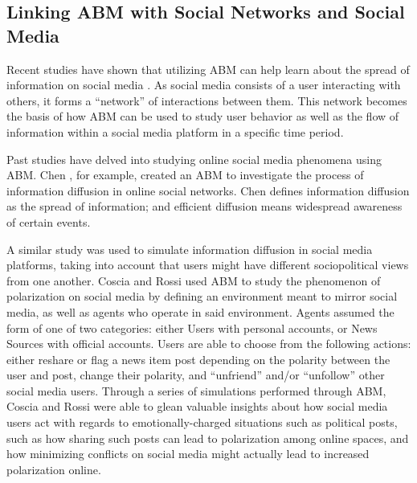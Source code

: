 \subsection{Linking ABM with Social Networks and Social Media}
Recent studies have shown that utilizing ABM can help learn about the spread of information on social media \cite{Fan-2018,Chen-2019,DiCarlo-2021,Coscia-2022}. As social media consists of a user interacting with others, it forms a “network” of interactions between them. This network becomes the basis of how ABM can be used to study user behavior as well as the flow of information within a social media platform in a specific time period.

Past studies have delved into studying online social media phenomena using ABM. Chen \cite{Chen-2019}, for example, created an ABM to investigate the process of information diffusion in online social networks. Chen \cite{Chen-2019} defines information diffusion as the spread of information; and efficient diffusion means widespread awareness of certain events.

A similar study was used to simulate information diffusion in social media platforms, taking into account that users might have different sociopolitical views from one another. Coscia and Rossi \cite{Coscia-2022} used ABM to study the phenomenon of polarization on social media by defining an environment meant to mirror social media, as well as agents who operate in said environment. Agents assumed the form of one of two categories: either Users with personal accounts, or News Sources with official accounts. Users are able to choose from the following actions: either reshare or flag a news item post depending on the polarity between the user and post, change their polarity, and “unfriend” and/or “unfollow” other social media users. Through a series of simulations performed through ABM, Coscia and Rossi \cite{Coscia-2022} were able to glean valuable insights about how social media users act with regards to emotionally-charged situations such as political posts, such as how sharing such posts can lead to polarization among online spaces, and how minimizing conflicts on social media might actually lead to increased polarization online.

